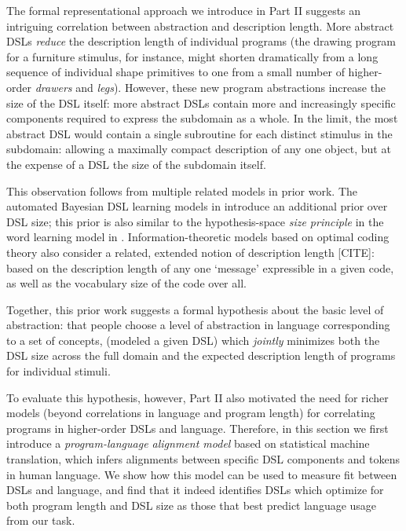 The formal representational approach we introduce in Part II suggests an intriguing correlation between abstraction and description length. More abstract DSLs \textit{reduce} the description length of individual programs (the drawing program for a furniture stimulus, for instance, might shorten dramatically from a long sequence of individual shape primitives to one from a small number of higher-order \textit{drawers} and \textit{legs}). However, these new program abstractions increase the size of the DSL itself: more abstract DSLs contain more and increasingly specific components required to express the subdomain as a whole. In the limit, the most abstract DSL would contain a single subroutine for each distinct stimulus in the subdomain: allowing a maximally compact description of any one object, but at the expense of a DSL the size of the subdomain itself.

This observation follows from multiple related models in prior work. The automated Bayesian DSL learning models in  introduce an additional prior over DSL size; this prior is also similar to the hypothesis-space \textit{size principle} in the word learning model in . Information-theoretic models based on optimal coding theory also consider a related, extended notion of description length [CITE]: based on the description length of any one ‘message’ expressible in a given code, as well as the vocabulary size of the code over all.

Together, this prior work suggests a formal hypothesis about the basic level of abstraction: that people choose a level of abstraction in language corresponding to a set of concepts, (modeled a given DSL) which \textit{jointly} minimizes both the DSL size across the full domain and the expected description length of programs for individual stimuli.

To evaluate this hypothesis, however, Part II also motivated the need for richer models (beyond correlations in language and program length) for correlating programs in higher-order DSLs and language. Therefore, in this section we first introduce a \textit{program-language alignment model} based on statistical machine translation, which infers alignments between specific DSL components and tokens in human language. We show how this model can be used to measure fit between DSLs and language, and find that it indeed identifies DSLs which optimize for both program length and DSL size as those that best predict language usage from our task.

